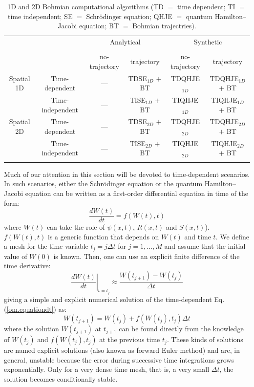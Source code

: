\documentclass[onecolumn,nofootinbib, secnumarabic, amsmath, nobibnotes,11pt,aps,pra]{revtex4-1}
\newcommand{\eref}[1]{Eq. (\ref{#1})}
\begin{document}
\begin{table}
\caption{1D and 2D Bohmian computational algorithms (TD $=$ time dependent; TI $=$ time independent; SE $=$ Schr\"odinger equation; QHJE $=$ quantum Hamilton--Jacobi equation; BT $=$ Bohmian trajectries).}{%
\begin{tabular}{@{}cccccc@{}} \toprule
 & & \multicolumn{2}{c}{Analytical} & \multicolumn{2}{c}{Synthetic} \\
 \cline{3-6}\\[-10pt]
 & & no-trajectory & trajectory & no-trajectory & trajectory \\ \colrule
 Spatial 1D & Time-dependent & --- & TDSE$_{1D}$ $+$ BT & TDQHJE$_{1D}$ & TDQHJE$_{1D}$ $+$ BT\\
 & Time-independent & --- & TISE$_{1D}$ $+$ BT & TIQHJE$_{1D}$ & TIQHJE$_{1D}$ $+$ BT\\ \botrule
 Spatial 2D & Time-dependent & --- & TDSE$_{2D}$ $+$ BT & TDQHJE$_{2D}$ & TDQHJE$_{2D}$ $+$ BT\\
 & Time-independent & --- & TISE$_{2D}$ $+$ BT & TIQHJE$_{2D}$ & TIQHJE$_{2D}$ $+$ BT\\ \botrule
\end{tabular}}\label{tblA.1}
\end{table}

Much of our attention in this section will be devoted to
time-dependent scenarios. In such scenarios, either the
Schr\"odinger equation or the quantum Hamilton--Jacobi equation can
be written as a first-order differential equation in time of the
form:\enlargethispage{-1pc}
\begin{equation}
\label{om.equationdt}
\frac {dW(t)} {dt} = f(W(t),t)
\end{equation}
where $W(t)$ can take the role of $\psi(x,t)$, $R(x,t)$ and
$S(x,t)$). $f(W(t),t)$ is a generic function that depends on $W(t)$
and time $t$.  We define a mesh for the time variable $t_j = j
\Delta t$ for $j = 1,\ldots,M$ and assume that the initial value of
$W(0)$ is known. Then, one can use an explicit finite difference of
the time derivative:
\begin{equation}
\left.\frac {dW(t)} {dt}\right|_{t = t_j} \approx \frac {W(t_{j + 1})-W(t_j)} {\Delta t}
\end{equation}
giving a simple and explicit numerical solution of the time-dependent \eref{om.equationdt} as:
\begin{equation}
\label{om.explicit}
W(t_{j + 1}) = W(t_j) + f(W(t_j),t_j) \Delta t
\end{equation}
where the solution $W(t_{j + 1})$ at $t_{j + 1}$ can be found
directly from the knowledge of $W(t_j)$ and $f(W(t_j),t_j)$ at the
previous time $t_j$. These kinds of solutions are named explicit
solutions  (also known as forward Euler method) and are, in general,
unstable because the error during successive time integrations grows
exponentially. Only for a very dense time mesh, that is, a very
small $\Delta t$, the solution becomes conditionally stable.
\end{document}
